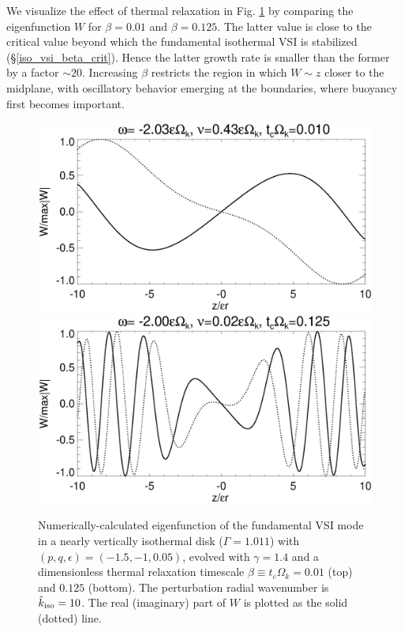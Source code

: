 We visualize the effect of thermal relaxation in 
Fig. \ref{relax_eigenW_num} by comparing the eigenfunction $W$ for
$\beta=0.01$ and $\beta=0.125$. The latter value is close to the critical
value beyond which the fundamental isothermal VSI is stabilized
(\S\ref{iso_vsi_beta_crit}). Hence the latter growth rate is smaller
than the former by a factor $\sim 20$. Increasing $\beta$ restricts 
the region in which $W\sim z$ closer to the midplane, with oscillatory
behavior emerging at the boundaries, where buoyancy first becomes
important. %

\begin{figure}
  \includegraphics[width=\linewidth,clip=true,trim=0cm 1.75cm 0cm
  0cm]{figures/eigenvectorW_beta0d01} 
  \includegraphics[width=\linewidth,clip=true,trim=0cm 0cm 0cm
  0cm]{figures/eigenvectorW_beta0d125} 
  \caption{Numerically-calculated eigenfunction of the fundamental VSI
    mode in a nearly vertically isothermal disk ($\Gamma=1.011$) with
    $(p,q,\epsilon)=(-1.5,-1,0.05)$, evolved with $\gamma=1.4$ and a dimensionless 
    thermal relaxation timescale $\beta \equiv t_c\Omega_k = 0.01$
    (top) and $0.125$ (bottom). The
    perturbation radial wavenumber is $\hat{k}_\mathrm{iso}=10$. The
    real (imaginary) part of $W$ is plotted as the solid (dotted)
    line.
    \label{relax_eigenW_num}}  
\end{figure}

